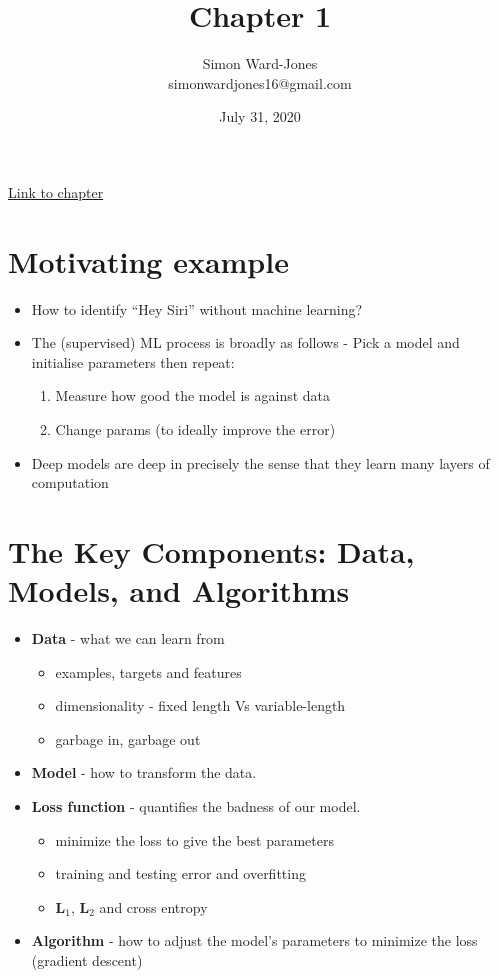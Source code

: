 \documentclass[12pt,notitlepage]{article}
\begin{document}


\title{\Large{\textbf{Chapter 1}}}
\date{July 31, 2020}
\author{Simon Ward-Jones\\simonwardjones16@gmail.com}

\maketitle
\href{https://d2l.ai/chapter_introduction/index.html}{Link to chapter}

\section{Motivating example}
\begin{itemize}
    \item How to identify ``Hey Siri'' without machine learning?
    \item The (supervised) ML process is broadly as follows -
          Pick a model and initialise parameters then repeat:
          \begin{enumerate}
              \item Measure how good the model is against data
              \item Change params (to ideally improve the error)
          \end{enumerate}
    \item Deep models are deep in precisely the sense that they learn many layers of computation
\end{itemize}

\section{The Key Components: Data, Models, and Algorithms}
\begin{itemize}
    \item \textbf{Data} - what we can learn from
          \begin{itemize}
              \item examples, targets and features
              \item dimensionality - fixed length Vs variable-length
              \item garbage in, garbage out
          \end{itemize}
    \item \textbf{Model} - how to transform the data.
    \item \textbf{Loss function} - quantifies the badness of our model.
          \begin{itemize}
              \item minimize the loss to give the best parameters
              \item training and testing error and overfitting
              \item $\mathbf{L}_1$, $\mathbf{L}_2$ and cross entropy
          \end{itemize}
    \item \textbf{Algorithm} - how to adjust the model’s parameters to minimize the loss (gradient descent)
\end{itemize}
\end{document}
